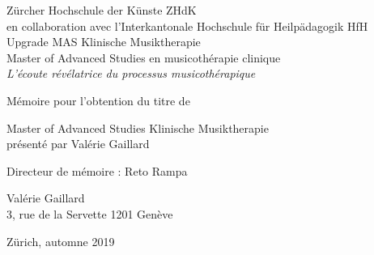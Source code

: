 
\begin{titlepage}
 \begin{center}
    \Large
     Zürcher Hochschule der Künste ZHdK\\
 	en collaboration avec l'Interkantonale Hochschule für
        Heilpädagogik HfH \\
	 Upgrade MAS Klinische Musiktherapie \\ Master of Advanced Studies en musicothérapie clinique\\
  \vfill
  { \LARGE
\emph{L'écoute révélatrice du processus musicothérapique }\\ \bigskip
	 }
 \vfill
 
Mémoire pour l'obtention du titre de

Master of Advanced Studies Klinische Musiktherapie \\ présenté par Valérie Gaillard

{\large Directeur de mémoire : Reto Rampa}


 {\large

	 Valérie Gaillard \\ 3, rue de la Servette   \hfill 1201 Genève\\
	 \rule{0mm}{1pt} \hfill Zürich, automne 2019}
 \end{center}
\end{titlepage}

